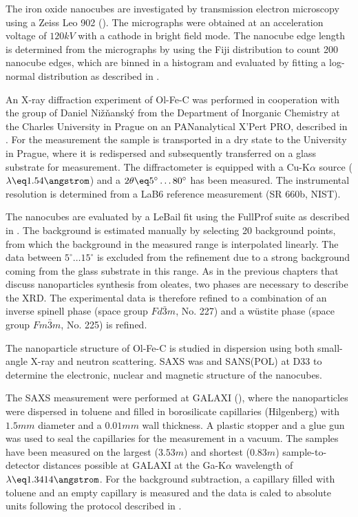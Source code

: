 \documentclass[\main/dresen_thesis.tex]{subfiles}
\begin{document}
    The iron oxide nanocubes are investigated by transmission electron microscopy using a Zeiss Leo 902 ().
    The micrographs were obtained at an acceleration voltage of $120 \unit{kV}$ with a  cathode in bright field mode.
    The nanocube edge length is determined from the micrographs by using the Fiji distribution \cite{Schindelin_2012_Fijia} to count 200 nanocube edges, which are binned in a histogram and evaluated by fitting a log-normal distribution as described in .

    An X-ray diffraction experiment of Ol-Fe-C was performed in cooperation with the group of Daniel Nižňanský from the Department of Inorganic Chemistry at the Charles University in Prague on an PANanalytical X'Pert PRO, described in .
    For the measurement the sample is transported in a dry state to the University in Prague, where it is redispersed and subsequently transferred on a glass substrate for measurement.
    The diffractometer is equipped with a Cu-K$\alpha$ source ($\lambda \eq 1.54 \angstrom$) and a $2 \theta \eq 5^\circ \ldots 80^\circ$ has been measured.
    The instrumental resolution is determined from a LaB6 reference measurement (SR 660b, NIST).

    The nanocubes are evaluated by a LeBail fit using the FullProf suite \cite{Rodriguez_1993_Recen} as described in .
    The background is estimated manually by selecting 20 background points, from which the background in the measured range is interpolated linearly.
    The data between $5 ^\circ \ldots 15 ^\circ$ is excluded from the refinement due to a strong background coming from the glass substrate in this range.
    As in the previous chapters that discuss nanoparticles synthesis from oleates, two phases are necessary to describe the XRD.
    The experimental data is therefore refined to a combination of an inverse spinell phase (space group $Fd\bar{3}m$, No. 227) and a w\"ustite phase (space group $Fm\bar{3}m$, No. 225) is refined.

    The nanoparticle structure of Ol-Fe-C is studied in dispersion using both small-angle X-ray and neutron scattering.
    SAXS was  and SANS(POL) at D33 to determine the electronic, nuclear and magnetic structure of the nanocubes.

    The SAXS measurement were performed at GALAXI (), where the nanoparticles were dispersed in toluene and filled in borosilicate capillaries (Hilgenberg) with $1.5 \unit{mm}$ diameter and a $0.01 \unit{mm}$ wall thickness.
    A plastic stopper and a glue gun was used to seal the capillaries for the measurement in a vacuum.
    The samples have been measured on the largest ($3.53 \unit{m}$) and shortest ($0.83 \unit{m}$) sample-to-detector distances possible at GALAXI at the Ga-K$\alpha$ wavelength of $\lambda \eq 1.3414 \angstrom$.
    For the background subtraction, a capillary filled with toluene and an empty capillary is measured and the data is caled to absolute units following the protocol described in .
\end{document}
